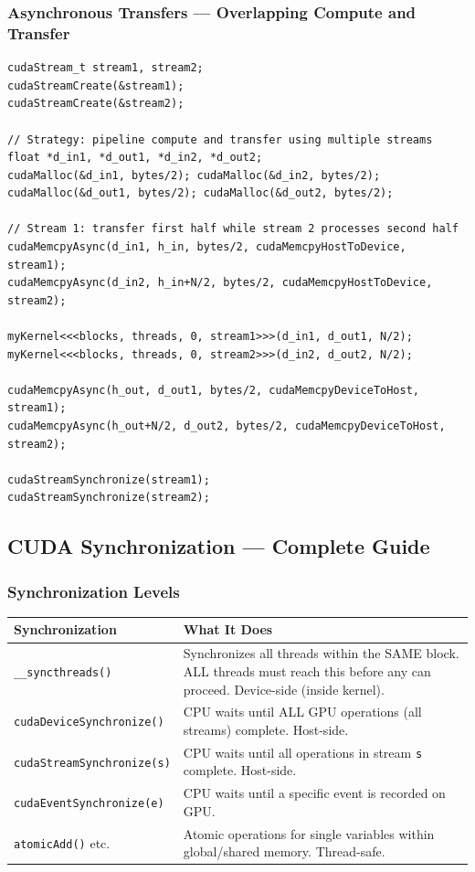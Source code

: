 \documentclass[11pt,a4paper]{article}
\newcommand{\code}[1]{\texttt{\small\colorbox{codebg}{\color{codekw}#1}}}
\begin{document}
\subsubsection{Asynchronous Transfers --- Overlapping Compute and Transfer}

\begin{lstlisting}
cudaStream_t stream1, stream2;
cudaStreamCreate(&stream1);
cudaStreamCreate(&stream2);

// Strategy: pipeline compute and transfer using multiple streams
float *d_in1, *d_out1, *d_in2, *d_out2;
cudaMalloc(&d_in1, bytes/2); cudaMalloc(&d_in2, bytes/2);
cudaMalloc(&d_out1, bytes/2); cudaMalloc(&d_out2, bytes/2);

// Stream 1: transfer first half while stream 2 processes second half
cudaMemcpyAsync(d_in1, h_in, bytes/2, cudaMemcpyHostToDevice, stream1);
cudaMemcpyAsync(d_in2, h_in+N/2, bytes/2, cudaMemcpyHostToDevice, stream2);

myKernel<<<blocks, threads, 0, stream1>>>(d_in1, d_out1, N/2);
myKernel<<<blocks, threads, 0, stream2>>>(d_in2, d_out2, N/2);

cudaMemcpyAsync(h_out, d_out1, bytes/2, cudaMemcpyDeviceToHost, stream1);
cudaMemcpyAsync(h_out+N/2, d_out2, bytes/2, cudaMemcpyDeviceToHost, stream2);

cudaStreamSynchronize(stream1);
cudaStreamSynchronize(stream2);
\end{lstlisting}

\subsection{CUDA Synchronization --- Complete Guide}

\subsubsection{Synchronization Levels}

\begin{center}
\begin{tabular}{L{5cm} L{9cm}}
\toprule
\textbf{Synchronization} & \textbf{What It Does} \\
\midrule
\code{\_\_syncthreads()} & Synchronizes all threads within the SAME block. ALL threads must reach this before any can proceed. Device-side (inside kernel). \\[4pt]
\code{cudaDeviceSynchronize()} & CPU waits until ALL GPU operations (all streams) complete. Host-side. \\[4pt]
\code{cudaStreamSynchronize(s)} & CPU waits until all operations in stream \code{s} complete. Host-side. \\[4pt]
\code{cudaEventSynchronize(e)} & CPU waits until a specific event is recorded on GPU. \\[4pt]
\code{atomicAdd()} etc. & Atomic operations for single variables within global/shared memory. Thread-safe. \\
\bottomrule
\end{tabular}
\end{center}
\end{document}

